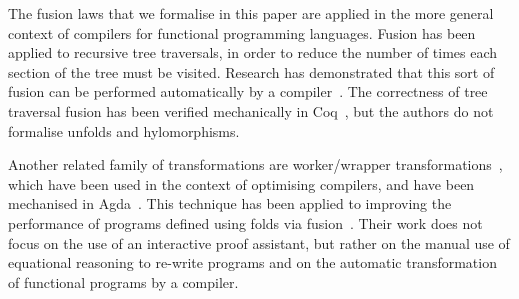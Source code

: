 \documentclass[a4paper,UKenglish,cleveref, autoref, thm-restate]{lipics-v2021}
\newcommand{\haskell}[1]{\texttt{#1}}
\begin{document}
The fusion laws that we formalise in this paper are applied in the more general
context of compilers for functional programming languages.  Fusion has been
applied to recursive tree traversals, in order to reduce the number of times
each section of the tree must be visited. Research has demonstrated that this
sort of fusion can be performed automatically by a
compiler~\cite{10.1145/3133900}. The correctness of tree traversal fusion has
been verified mechanically in Coq~\cite{10.1145/3377555.3377884}, but the
authors do not formalise unfolds and hylomorphisms.

Another related family of transformations are worker/wrapper
transformations~\cite{gill09}, which have been used in the context of optimising
compilers, and have been mechanised in Agda~\cite{SCULTHORPE_HUTTON_2014}. This
technique has been applied to improving the performance of programs defined
using folds via fusion~\cite{hutton10}. Their work does not focus on the use of
an interactive proof assistant, but rather on the manual use of equational
reasoning to re-write programs and on the automatic transformation of functional
programs by a compiler.




\end{document}
